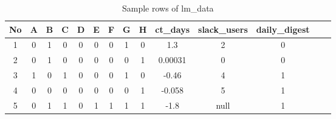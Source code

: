
\newcommand*\rot{\rotatebox{90}}
\begin{table}[ht]
\begin{center}
\begin{tabular}{|c|c|c|c|c|c|c|c|c|c|c|c|c|c|} 
\hline

No & A & B & C & D & E & F & G & H & ct\_days & slack\_users & daily\_digest \\ [0.5ex]
\hline\hline

1 & 0 & 1 & 0 & 0 & 0 & 0 & 1 & 0 & 1.3 & 2 & 0 \\
2 & 0 & 1 & 0 & 0 & 0 & 0 & 0 & 1 & 0.00031 & 0 & 0 \\ 
3 & 1 & 0 & 1 & 0 & 0 & 0 & 1 & 0 & -0.46 & 4 & 1 \\
4 & 0 & 0 & 0 & 0 & 0 & 0 & 0 & 1 & -0.058 & 5 & 1 \\
5 & 0 & 1 & 1 & 0 & 1 & 1 & 1 & 1 & -1.8 & null & 1 \\

\hline
\end{tabular}
\caption{Sample rows of lm\_data}
\label{tab:dataExample}
\end{center}
\end{table}
